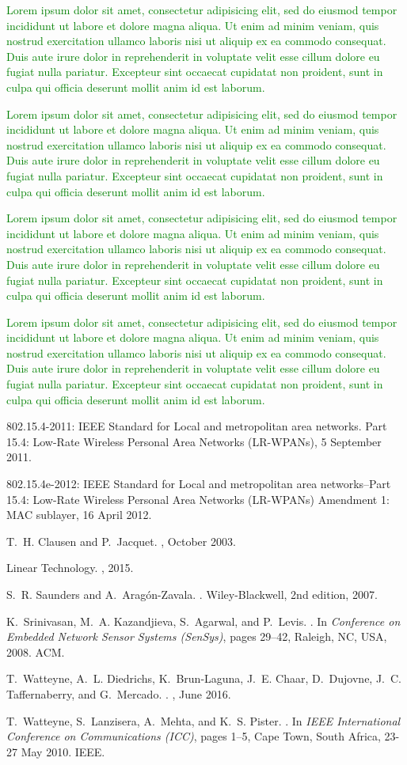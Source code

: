 \documentclass{elsarticle}
\newcommand{\lorem}          {\textcolor{green}{Lorem ipsum dolor sit amet, consectetur adipisicing elit, sed do eiusmod tempor incididunt ut labore et dolore magna aliqua. Ut enim ad minim veniam, quis nostrud exercitation ullamco laboris nisi ut aliquip ex ea commodo consequat. Duis aute irure dolor in reprehenderit in voluptate velit esse cillum dolore eu fugiat nulla pariatur. Excepteur sint occaecat cupidatat non proident, sunt in culpa qui officia deserunt mollit anim id est laborum.}}
\begin{document}
\lorem


\lorem


\lorem


\lorem

%
%

\begin{thebibliography}{10}

{802.15.4-2011: IEEE Standard for Local and metropolitan area networks. Part
  15.4: Low-Rate Wireless Personal Area Networks (LR-WPANs)}, 5 September 2011.

{802.15.4e-2012: IEEE Standard for Local and metropolitan area networks--Part
  15.4: Low-Rate Wireless Personal Area Networks (LR-WPANs) Amendment 1: MAC
  sublayer}, 16 April 2012.

T.~H. Clausen and P.~Jacquet.
, October 2003.

Linear Technology.
, 2015.

\newpage

S.~R. Saunders and A.~Arag\'on-Zavala.
.
\newblock Wiley-Blackwell, 2nd edition, 2007.

K.~Srinivasan, M.~A. Kazandjieva, S.~Agarwal, and P.~Levis.
.
\newblock In {\em Conference on Embedded Network Sensor Systems (SenSys)},
  pages 29--42, Raleigh, NC, USA, 2008. ACM.

T.~Watteyne, A.~L. Diedrichs, K.~Brun-Laguna, J.~E. Chaar, D.~Dujovne, J.~C.
  Taffernaberry, and G.~Mercado.
.
, June
  2016.

T.~Watteyne, S.~Lanzisera, A.~Mehta, and K.~S. Pister.
.
\newblock In {\em IEEE International Conference on Communications (ICC)}, pages
  1--5, Cape Town, South Africa, 23-27 May 2010. IEEE.


\end{thebibliography}
\end{document}
